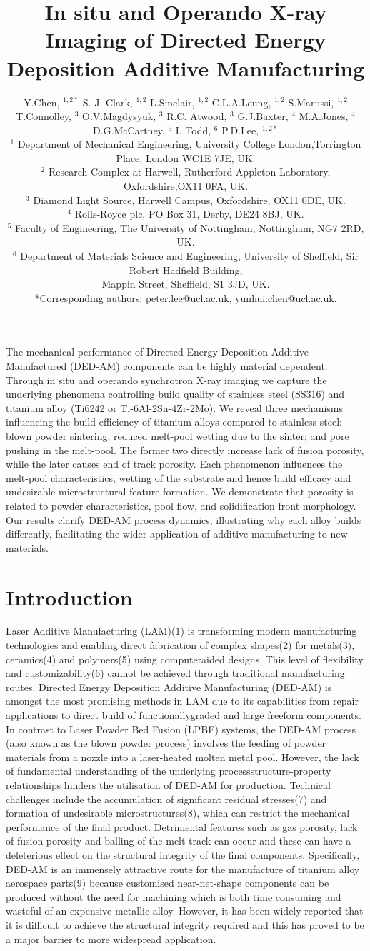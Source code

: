 \documentclass[10pt]{article}
\title{In situ and Operando X-ray Imaging of Directed Energy Deposition Additive Manufacturing }
\author{Y.Chen, ${ }^{1,2 *}$ S. J. Clark, ${ }^{1,2}$ L.Sinclair, ${ }^{1,2}$ C.L.A.Leung, ${ }^{1,2}$ S.Marussi, ${ }^{1,2}$\\
T.Connolley, ${ }^{3}$ O.V.Magdysyuk, ${ }^{3}$ R.C. Atwood, ${ }^{3}$ G.J.Baxter, ${ }^{4}$ M.A.Jones, ${ }^{4}$\\
D.G.McCartney, ${ }^{5}$ I. Todd, ${ }^{6}$ P.D.Lee, ${ }^{1,2 *}$\\
${ }^{1}$ Department of Mechanical Engineering, University College London,Torrington Place, London WC1E 7JE, UK.\\
${ }^{2}$ Research Complex at Harwell, Rutherford Appleton Laboratory, Oxfordshire,OX11 0FA, UK.\\
${ }^{3}$ Diamond Light Source, Harwell Campus, Oxfordshire, OX11 0DE, UK.\\
${ }^{4}$ Rolls-Royce plc, PO Box 31, Derby, DE24 8BJ, UK.\\
${ }^{5}$ Faculty of Engineering, The University of Nottingham, Nottingham, NG7 2RD, UK.\\
${ }^{6}$ Department of Materials Science and Engineering, University of Sheffield, Sir Robert Hadfield Building,\\
Mappin Street, Sheffield, S1 3JD, UK.\\
*Corresponding authors: peter.lee@ucl.ac.uk, yunhui.chen@ucl.ac.uk.}
\date{}
\begin{document}
\maketitle
The mechanical performance of Directed Energy Deposition Additive Manufactured (DED-AM) components can be highly material dependent. Through in situ and operando synchrotron X-ray imaging we capture the underlying phenomena controlling build quality of stainless steel (SS316) and titanium alloy (Ti6242 or Ti-6Al-2Sn-4Zr-2Mo). We reveal three mechanisms influencing the build efficiency of titanium alloys compared to stainless steel: blown powder sintering; reduced melt-pool wetting due to the sinter; and pore pushing in the melt-pool. The former two directly increase lack of fusion porosity, while the later causes end of track porosity. Each phenomenon influences the melt-pool characteristics, wetting of the substrate and hence build efficacy and undesirable microstructural feature formation. We demonstrate that porosity is related to powder characteristics, pool flow, and solidification front morphology. Our results clarify DED-AM process dynamics, illustrating why each alloy builds differently, facilitating the wider application of additive manufacturing to new materials.

\section*{Introduction}
Laser Additive Manufacturing (LAM)(1) is transforming modern manufacturing technologies and enabling direct fabrication of complex shapes(2) for metals(3), ceramics(4) and polymers(5) using computeraided designs. This level of flexibility and customizability(6) cannot be achieved through traditional manufacturing routes. Directed Energy Deposition Additive Manufacturing (DED-AM) is amongst the most promising methods in LAM due to its capabilities from repair applications to direct build of functionallygraded and large freeform components. In contrast to Laser Powder Bed Fusion (LPBF) systems, the DED-AM process (also known as the blown powder process) involves the feeding of powder materials from a nozzle into a laser-heated molten metal pool. However, the lack of fundamental understanding of the underlying processstructure-property relationships hinders the utilisation of DED-AM for production. Technical challenges include the accumulation of significant residual stresses(7) and formation of undesirable microstructures(8), which can restrict the mechanical performance of the final product. Detrimental features such as gas porosity, lack of fusion porosity and balling of the melt-track can occur and these can have a deleterious effect on the structural integrity of the final components. Specifically, DED-AM is an immensely attractive route for the manufacture of titanium alloy aerospace parts(9) because customised near-net-shape components can be produced without the need for machining which is both time consuming and wasteful of an expensive metallic alloy. However, it has been widely reported that it is difficult to achieve the structural integrity required and this has proved to be a major barrier to more widespread application.
\end{document}
